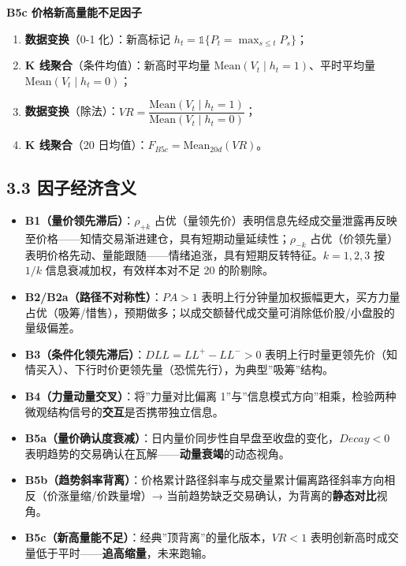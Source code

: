 \documentclass[UTF8,a4paper,zihao=-4,fontset=windows]{ctexart}
\providecommand{\tightlist}{\setlength{\itemsep}{0pt}\setlength{\parskip}{0pt}}
\begin{document}
\textbf{B5c 价格新高量能不足因子}

\begin{enumerate}
\def\labelenumi{\arabic{enumi}.}
\tightlist
\item
  \textbf{数据变换}（0-1 化）：新高标记
  \(h_t=\mathbb{1}\{P_t=\max_{s\le t}P_s\}\)；
\item
  \textbf{K 线聚合}（条件均值）：新高时平均量
  \(\mathrm{Mean}(V_t\mid h_t=1)\)、平时平均量
  \(\mathrm{Mean}(V_t\mid h_t=0)\)；
\item
  \textbf{数据变换}（除法）：\(VR=\dfrac{\mathrm{Mean}(V_t\mid h_t=1)}{\mathrm{Mean}(V_t\mid h_t=0)}\)；
\item
  \textbf{K 线聚合}（20 日均值）：\(F_{B5c}=\mathrm{Mean}_{20d}(VR)\)。
\end{enumerate}

\subsection{3.3
因子经济含义}\label{ux56e0ux5b50ux7ecfux6d4eux542bux4e49-1}

\begin{itemize}
\tightlist
\item
  \textbf{B1（量价领先滞后）}：\(\rho_{+k}\)
  占优（量领先价）表明信息先经成交量泄露再反映至价格------知情交易渐进建仓，具有短期动量延续性；\(\rho_{-k}\)
  占优（价领先量）表明价格先动、量能跟随------情绪追涨，具有短期反转特征。\(k=1,2,3\)
  按 \(1/k\) 信息衰减加权，有效样本对不足 20 的阶剔除。
\item
  \textbf{B2/B2a（路径不对称性）}：\(PA>1\)
  表明上行分钟量加权振幅更大，买方力量占优（吸筹/惜售），预期做多；以成交额替代成交量可消除低价股/小盘股的量级偏差。
\item
  \textbf{B3（条件化领先滞后）}：\(DLL=LL^+-LL^->0\)
  表明上行时量更领先价（知情买入）、下行时价更领先量（恐慌先行），为典型''吸筹''结构。
\item
  \textbf{B4（力量动量交叉）}：将''力量对比偏离
  1''与''信息模式方向''相乘，检验两种微观结构信号的\textbf{交互}是否携带独立信息。
\item
  \textbf{B5a（量价确认度衰减）}：日内量价同步性自早盘至收盘的变化，\(Decay<0\)
  表明趋势的交易确认在瓦解------\textbf{动量衰竭}的动态视角。
\item
  \textbf{B5b（趋势斜率背离）}：价格累计路径斜率与成交量累计偏离路径斜率方向相反（价涨量缩/价跌量增）→
  当前趋势缺乏交易确认，为背离的\textbf{静态对比}视角。
\item
  \textbf{B5c（新高量能不足）}：经典''顶背离''的量化版本，\(VR<1\)
  表明创新高时成交量低于平时------\textbf{追高缩量}，未来跑输。
\end{itemize}
\end{document}
